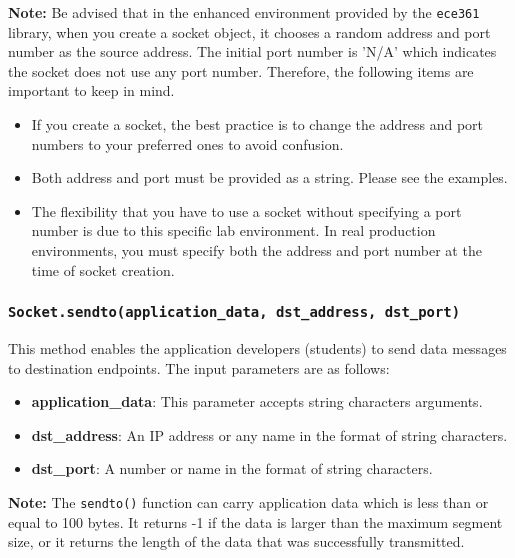 \documentclass[11pt]{article}
\begin{document}
\textbf{Note:}
Be advised that in the enhanced environment provided by the \texttt{ece361} library, when you create a socket object, it chooses a random address and port number as the source address. The initial port number is 'N/A' which indicates the socket does not use any port number. Therefore, the following items are important to keep in mind.
\begin{itemize}
    \item If you create a socket, the best practice is to change the address and port numbers to your preferred ones to avoid confusion.
    \item Both address and port must be provided as a string. Please see the examples.
    \item The flexibility that you have to use a socket without specifying a port number is due to this specific lab environment. In real production environments, you must specify both the address and port number at the time of socket creation.
\end{itemize}

\subsubsection{\texttt{Socket.sendto(application\_data, dst\_address, dst\_port)}}
This method enables the application developers (students) to send data messages to destination endpoints. The input parameters are as follows:
\begin{itemize}
    \item \textbf{application\_data}: This parameter accepts string characters arguments.
    \item \textbf{dst\_address}: An IP address or any name in the format of string characters.
    \item \textbf{dst\_port}: A number or name in the format of string characters.
\end{itemize}

\textbf{Note:}
The \texttt{sendto()} function can carry application data which is less than or equal to 100 bytes. It returns -1 if the data is larger than the maximum segment size, or it returns the length of the data that was successfully transmitted.
\end{document}
